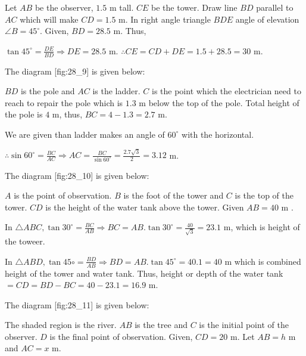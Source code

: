   \startplacefigure[reference=fig:28_8]
    \externalfigure[28_8.pdf]
  \stopplacefigure

  Let $AB$ be the observer, $1.5$ m tall. $CE$ be the tower. Draw line $BD$ parallel to $AC$ which
  will make $CD = 1.5$ m. In right angle triangle $BDE$ angle of elevation $\angle B = 45^\circ$. Given,
  $BD = 28.5$ m. Thus,

  $\tan45^\circ = \frac{DE}{BD} \Rightarrow DE = 28.5$ m. $\therefore CE = CD + DE = 1.5 + 28.5 = 30$ m.

\item The diagram [fig:28_9] is given below:

  \startplacefigure[reference=fig:28_9]
    \externalfigure[28_9.pdf]
  \stopplacefigure

  $BD$ is the pole and $AC$ is the ladder. $C$ is the point which the electrician need to reach to repair the
  pole which is $1.3$ m below the top of the pole. Total height of the pole is $4$ m, thus, $BC = 4 - 1.3 =
  2.7$ m.

  We are given than ladder makes an angle of $60^\circ$ with the horizontal.

  $\therefore \sin60^\circ = \frac{BC}{AC} \Rightarrow AC = \frac{BC}{\sin60^\circ} = \frac{2.7\sqrt{3}}{2} = 3.12$ m.

\item The diagram [fig:28_10] is given below:

  \startplacefigure[reference=fig:28_10]
    \externalfigure[28_10.pdf]
  \stopplacefigure

  $A$ is the point of observation. $B$ is the foot of the tower and $C$ is the top of the tower. $CD$ is
  the height of the water tank above the tower. Given $AB = 40$ m .

  In $\triangle ABC, \tan30^\circ = \frac{BC}{AB} \Rightarrow BC = AB.\tan30^\circ = \frac{40}{\sqrt{3}} = 23.1$ m,
  which is height of the toweer.

  In $\triangle ABD, \tan45\circ = \frac{BD}{AB} \Rightarrow BD = AB.\tan45^\circ = 40.1 = 40$ m which is combined height
  of the tower and water tank. Thus, height or depth of the water tank $= CD = BD - BC = 40 - 23.1 = 16.9$ m.

\item The diagram [fig:28_11] is given below:

  \startplacefigure[reference=fig:28_11]
    \externalfigure[28_11.pdf]
  \stopplacefigure

  The shaded region is the river. $AB$ is the tree and $C$ is the initial point of the observer. $D$ is the final
  point of observation. Given, $CD = 20$ m. Let $AB = h$ m and $AC = x$ m.

